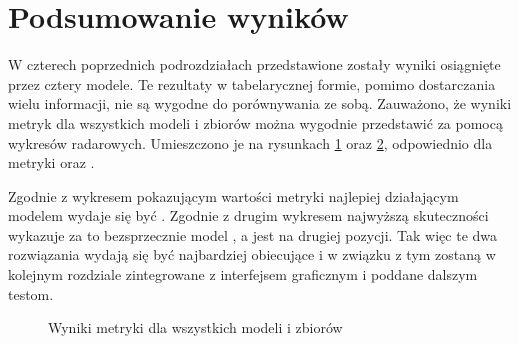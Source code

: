 \section{Podsumowanie wyników}
W czterech poprzednich podrozdziałach przedstawione zostały wyniki osiągnięte przez cztery modele. Te rezultaty w tabelarycznej formie, pomimo dostarczania wielu informacji, nie są wygodne do porównywania ze sobą. Zauważono, że wyniki metryk dla wszystkich modeli i zbiorów można wygodnie przedstawić za pomocą wykresów radarowych. Umieszczono je na rysunkach \ref{fig:experiments-em} oraz \ref{fig:experiments-ex}, odpowiednio dla metryki  oraz .

Zgodnie z wykresem pokazującym wartości metryki  najlepiej działającym modelem wydaje się być . Zgodnie z drugim wykresem najwyższą skuteczności wykazuje za to bezsprzecznie model , a  jest na drugiej pozycji. Tak więc te dwa rozwiązania wydają się być najbardziej obiecujące i w związku z tym zostaną w kolejnym rozdziale zintegrowane z interfejsem graficznym i poddane dalszym testom.

\begin{figure}[H]
  \centering
  
  \caption{Wyniki metryki  dla wszystkich modeli i zbiorów}
  \label{fig:experiments-em}
\end{figure}

\begin{figure}[H]
  \centering
  
  \label{fig:experiments-ex}
\end{figure}
